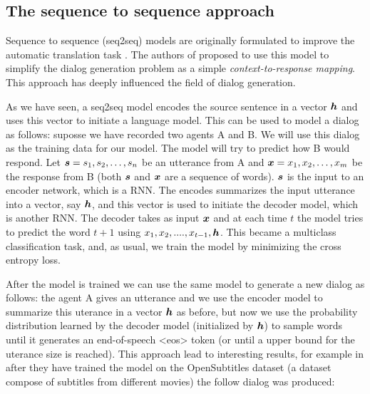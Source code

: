 \subsection{The sequence to sequence approach}

Sequence to sequence (seq2seq) models are originally formulated to improve the automatic translation task \cite{Sustskever}. The authors of \cite{DBLP:journals/corr/VinyalsL15} proposed to use this model to simplify the dialog generation problem as a simple \textit{context-to-response mapping}. This approach has deeply influenced the field of dialog generation.

As we have seen, a seq2seq model encodes the source sentence in a vector $\bm{h}$ and uses this vector to initiate a language model. This can be used to model a dialog as follows: suposse we have recorded two agents A and B. We will use this dialog as the training data for our model. The model will try to predict how B would respond. Let $\bm{s} = s_1, s_2, \dots, s_n$ be an utterance from A and  $\bm{x} = x_1, x_2, \dots, x_m$ be the response from B (both $\bm{s}$ and $\bm{x}$ are a sequence of words). $\bm{s}$ is the input to an encoder network, which is a RNN. The encodes summarizes the input utterance into a vector, say $\bm{h}$, and this vector is used to initiate the decoder model, which is another RNN. The decoder takes as input $\bm{x}$ and at each time $t$ the model tries to predict the word $t+1$ using $x_1, x_2, ...., x_{t-1}, \bm{h}$. This became a multiclass classification task, and, as usual, we train the model by minimizing the cross entropy loss.


After the model is trained we can use the same model to generate a new dialog as follows: the agent A gives an utterance and we use the encoder model to summarize this uterance in a vector $\bm{h}$ as before, but now we use the probability distribution learned by the decoder model (initialized by $\bm{h}$) to sample words until it generates an end-of-speech <eos> token (or until a upper bound for the uterance size is reached). This approach lead to interesting results, for example in \cite{DBLP:journals/corr/VinyalsL15} after they have trained the model on the OpenSubtitles dataset (a dataset compose of subtitles from different movies) the follow dialog was produced:

